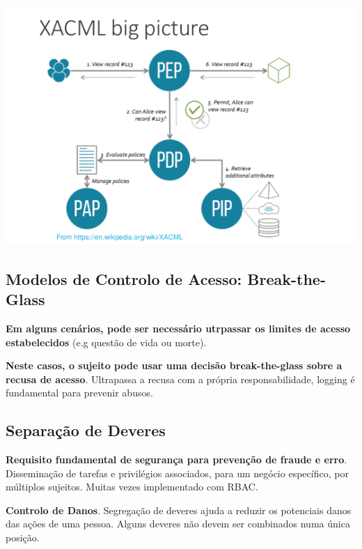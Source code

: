 \documentclass{article}
\begin{document}
\begin{center}
  \includegraphics[scale=0.4]{19}
\end{center}

\subsection{Modelos de Controlo de Acesso: Break-the-Glass}

\begin{flushleft}
  \textbf{Em alguns cenários, pode ser necessário utrpassar os limites de acesso estabelecidos}
  (e.g questão de vida ou morte).

  \vspace{2mm}

  \textbf{Neste casos, o sujeito pode usar uma decisão break-the-glass sobre a recusa de acesso}.
  Ultrapassa a recusa com a própria responsabilidade, logging é fundamental para
  prevenir abusos.
\end{flushleft}

\pagebreak

\subsection{Separação de Deveres}

\begin{flushleft}
  \textbf{Requisito fundamental de segurança para prevenção de fraude e erro}.
  Disseminação de tarefas e privilégios associados, para um negócio específico,
  por múltiplos sujeitos. Muitas vezes implementado com RBAC.
  
  \vspace{2mm}

  \textbf{Controlo de Danos}. Segregação de deveres ajuda a reduzir os potenciais
  danos das ações de uma pessoa. Alguns deveres não devem ser combinados numa única posição.
\end{flushleft}
\end{document}
